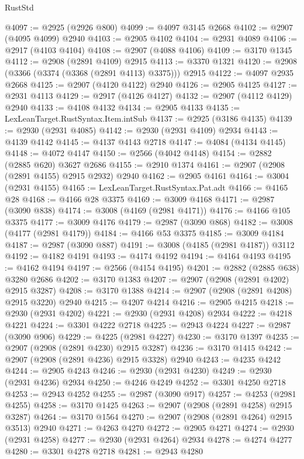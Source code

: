 \begin{lexlean}{RustStd}
\begin{coremodule}
@4097 := @2925 (@2926 @800)
@4099 := @4097 @3145 @2668
@4102 := @2907 (@4095 @4099) @2940
@4103 := @2905 @4102
@4104 := @2931 @4089
@4106 := @2917 (@4103 @4104)
@4108 := @2907 (@4088 @4106)
@4109 := @3170 @1345
@4112 := @2908 (@2891 @4109) @2915
@4113 := @3370 @1321
@4120 := @2908 (@3366 (@3374 (@3368 (@2891 @4113) @3375))) @2915
@4122 := @4097 @2935 @2668
@4125 := @2907 (@4120 @4122) @2940
@4126 := @2905 @4125
@4127 := @2931 @4113
@4129 := @2917 (@4126 @4127)
@4132 := @2907 (@4112 @4129) @2940
@4133 := @4108 @4132
@4134 := @2905 @4133
@4135 := LexLeanTarget.RustSyntax.Item.intSub
@4137 := @2925 (@3186 @4135)
@4139 := @2930 (@2931 @4085)
@4142 := @2930 (@2931 @4109) @2934
@4143 := @4139 @4142
@4145 := @4137 @4143 @2718
@4147 := @4084 (@4134 @4145)
@4148 := @4072 @4147
@4150 := @2566 (@4042 @4148)
@4154 := @2882 (@2885 @620) @3627 @2686
@4155 := @2910 @1374
@4161 := @2907 (@2908 (@2891 @4155) @2915 @2932) @2940
@4162 := @2905 @4161
@4164 := @3004 (@2931 @4155)
@4165 := LexLeanTarget.RustSyntax.Pat.adt
@4166 := @4165 @28
@4168 := @4166 @28 @3375
@4169 := @3009 @4168
@4171 := @2987 (@3090 @838)
@4174 := @3008 (@4169 (@2981 @4171))
@4176 := @4166 @105 @3375
@4177 := @3009 @4176
@4179 := @2987 (@3090 @868)
@4182 := @3008 (@4177 (@2981 @4179))
@4184 := @4166 @53 @3375
@4185 := @3009 @4184
@4187 := @2987 (@3090 @887)
@4191 := @3008 (@4185 (@2981 @4187)) @3112
@4192 := @4182 @4191
@4193 := @4174 @4192
@4194 := @4164 @4193
@4195 := @4162 @4194
@4197 := @2566 (@4154 @4195)
@4201 := @2882 (@2885 @638) @3280 @2686
@4202 := @3170 @1383
@4207 := @2907 (@2908 (@2891 @4202) @2915 @3287)
@4208 := @3170 @1388
@4214 := @2907 (@2908 (@2891 @4208) @2915 @3220) @2940
@4215 := @4207 @4214
@4216 := @2905 @4215
@4218 := @2930 (@2931 @4202)
@4221 := @2930 (@2931 @4208) @2934
@4222 := @4218 @4221
@4224 := @3301 @4222 @2718
@4225 := @2943 @4224
@4227 := @2987 (@3090 @906)
@4229 := @4225 (@2981 @4227)
@4230 := @3170 @1397
@4235 := @2907 (@2908 (@2891 @4230) @2915 @3287)
@4236 := @3170 @1415
@4242 := @2907 (@2908 (@2891 @4236) @2915 @3328) @2940
@4243 := @4235 @4242
@4244 := @2905 @4243
@4246 := @2930 (@2931 @4230)
@4249 := @2930 (@2931 @4236) @2934
@4250 := @4246 @4249
@4252 := @3301 @4250 @2718
@4253 := @2943 @4252
@4255 := @2987 (@3090 @917)
@4257 := @4253 (@2981 @4255)
@4258 := @3170 @1425
@4263 := @2907 (@2908 (@2891 @4258) @2915 @3287)
@4264 := @3170 @1564
@4270 := @2907 (@2908 (@2891 @4264) @2915 @3513) @2940
@4271 := @4263 @4270
@4272 := @2905 @4271
@4274 := @2930 (@2931 @4258)
@4277 := @2930 (@2931 @4264) @2934
@4278 := @4274 @4277
@4280 := @3301 @4278 @2718
@4281 := @2943 @4280

\end{coremodule}
\end{lexlean}
